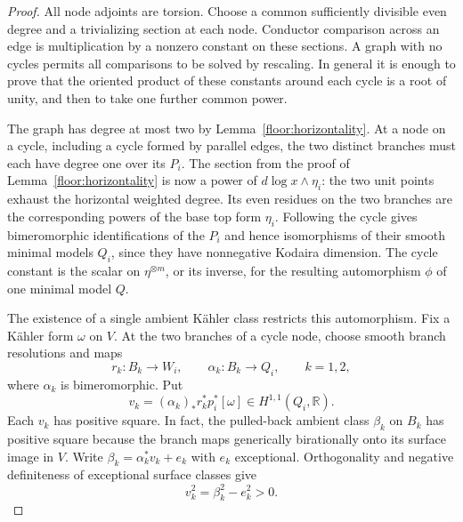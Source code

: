 \documentclass[11pt,letterpaper]{article}
\theoremstyle{definition}
\theoremstyle{remark}
\begin{document}
\begin{proof}
All node adjoints are torsion.  Choose a common sufficiently
divisible even degree and a trivializing section at each
node.  Conductor comparison across an edge is multiplication
by a nonzero constant on these sections.  A graph with no
cycles permits all comparisons to be solved by rescaling.
In general it is enough to prove that the oriented product
of these constants around each cycle is a root of unity,
and then to take one further common power.

The graph has degree at most two by
Lemma~\ref{floor:horizontality}.  At a node on a cycle,
including a cycle formed by parallel edges, the two distinct
branches must each have degree one over its $P_i$.  The
section from the proof of Lemma~\ref{floor:horizontality}
is now a power of $d\log x\wedge\eta_i$: the two unit
points exhaust the horizontal weighted degree.  Its even
residues on the two branches are the corresponding powers
of the base top form $\eta_i$.  Following the cycle gives
bimeromorphic identifications of the $P_i$ and hence
isomorphisms of their smooth minimal models $Q_i$, since
they have nonnegative Kodaira dimension.  The cycle
constant is the scalar on $\eta^{\otimes m}$, or its
inverse, for the resulting automorphism $\phi$ of one
minimal model $Q$.

The existence of a single ambient K\"ahler class restricts
this automorphism.  Fix a K\"ahler form $\omega$ on $V$.
At the two branches of a cycle node, choose smooth branch
resolutions and maps
\[
 r_k:B_k\longrightarrow W_i,\qquad
 \alpha_k:B_k\longrightarrow Q_i,\qquad k=1,2,
\]
where $\alpha_k$ is bimeromorphic.  Put
\[
 v_k=(\alpha_k)_*r_k^*p_i^*[\omega]
       \in H^{1,1}(Q_i,\mathbb{R}).
\]
Each $v_k$ has positive square.  In fact, the pulled-back
ambient class $\beta_k$ on $B_k$ has positive square because
the branch maps generically birationally onto its surface
image in $V$.  Write
$\beta_k=\alpha_k^*v_k+e_k$ with $e_k$ exceptional.
Orthogonality and negative definiteness of exceptional
surface classes give
\begin{equation}
 \label{floor:positive-branch-class}
 v_k^2=\beta_k^2-e_k^2>0.
\end{equation}


\end{proof}
\end{document}

